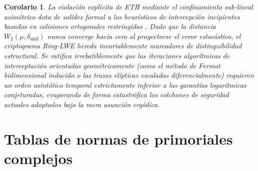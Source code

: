 \documentclass{article}
\numberwithin{equation}{section}
\theoremstyle{plain}
\newtheorem{corolario}[teorema]{Corolario}
\theoremstyle{definition}
\begin{document}
\begin{corolario}
La violación explícita de ETH mediante el confinamiento sub-lineal asimétrico dota de solidez formal a los heurísticos de intercepción incipientes basados en colisiones ortogonales restringidas \cite{Wenger2024}. Dado que la distancia $W_2(\mu, \delta_{\text{unif}})$ nunca converge hacia cero al proyectarse el error estocástico, el criptograma Ring-LWE hereda invariablemente marcadores de distinguibilidad estructural. Se ratifica irrebatiblemente que las iteraciones algorítmicas de interceptación orientadas geométricamente (como el método de Fermat bidimensional inducido o las trazas elípticas escaladas diferencialmente) requieren un orden asintótico temporal estrictamente inferior a las garantías logarítmicas conjeturadas, evaporando de forma catastrófica los colchones de seguridad actuales adoptados bajo la mera asunción ergódica.
\end{corolario}

\appendix

\section{Tablas de normas de primoriales complejos}
\label{apendice:tablas_primoriales}

\begin{table}[h!]
\centering
\renewcommand{\arraystretch}{1.5}
\caption{Evolución asintótica de la sucesión de primoriales de Gauss. El Nivel 2 ($\Pi_2$) resalta analíticamente como el atractor estacionario óptimo que maximiza el cociente de filtrado frente a la divergencia combinatoria del grupo de clases.}
\label{tabla:primoriales_gauss}
\end{table}
\end{document}
